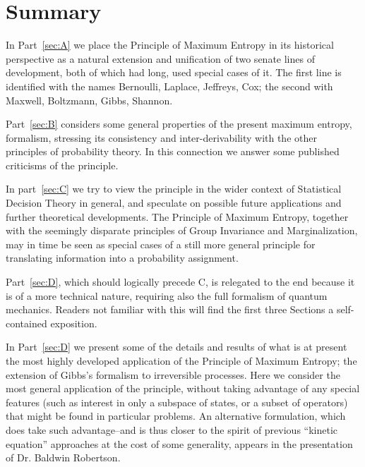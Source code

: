 \section*{Summary}
In Part~\ref{sec:A} we place the Principle of Maximum Entropy in its historical perspective as a natural extension and unification of two senate lines of development, both of which had long, used special cases of it.
The first line is identified with the names Bernoulli, Laplace, Jeffreys, Cox; the second with Maxwell, Boltzmann, Gibbs, Shannon.

Part~\ref{sec:B} considers some general properties of the present maximum entropy, formalism, stressing its consistency and inter-derivability with the other principles of probability theory.
In this connection we answer some published criticisms of the principle.

In part~\ref{sec:C} we try to view the principle in the wider context of Statistical Decision Theory in general, and speculate on possible future applications and further theoretical developments.
The Principle of Maximum Entropy, together with the seemingly disparate principles of Group Invariance and Marginalization, may in time be seen as special cases of a still more general principle for translating information into a probability assignment.

Part~\ref{sec:D}, which should logically precede C, is relegated to the end because it is of a more technical nature, requiring also the full formalism of quantum mechanics.
Readers not familiar with this will find the first three Sections a self-contained exposition.

In Part~\ref{sec:D} we present some of the details and results of what is at present the most highly developed application of the Principle of Maximum Entropy; the extension of Gibbs's formalism to irreversible processes.
Here we consider the most general application of the principle, without taking advantage of any	special features (such as interest in only a subspace of states, or a subset of operators) that might be found in particular problems. An alternative formulation, which does take such advantage--and is thus closer to the spirit of previous ``kinetic
equation'' approaches at the cost of some generality, appears in the presentation of Dr. Baldwin Robertson.